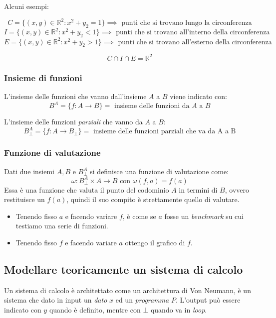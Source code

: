 \documentclass{article}
\begin{document}
Alcuni esempi:

$$C=\{(x,y)\in\mathbb{R}^2 : x^2+y_2=1\}\implies \text{ punti che si trovano lungo la circonferenza}$$
$$I=\{(x,y)\in\mathbb{R}^2 : x^2+y_2<1\}\implies \text{ punti che si trovano all'interno della circonferenza}$$
$$E=\{(x,y)\in\mathbb{R}^2 : x^2+y_2>1\}\implies \text{ punti che si trovano all'esterno della circonferenza}$$

$$C\cap I\cap E = \mathbb{R}^2$$

\subsubsection{Insieme di funzioni}
L'insieme delle funzioni che vanno dall'insieme $A$ a $B$ viene indicato con:
$$B^A=\{f:A\rightarrow B\} = \text{ insieme delle funzioni da } A \text{ a } B$$

L'insieme delle funzioni \textit{parziali} che vanno da $A$ a $B$:
$$B_{\bot}^A =\{f:A\rightarrow B_{\bot}\}=\text{ insieme delle funzioni parziali che va da A a B}$$

\subsubsection{Funzione di valutazione}
Dati due insiemi $A,B$ e $B_{\bot}^A$ si definisce una funzione di valutazione come:
$$\omega : B_{\bot}^A\times A \rightarrow B \text{ con } \omega (f,a)=f(a)$$
Essa è una funzione che valuta il punto del codominio $A$ in termini di $B$, ovvero restituisce un
$f(a)$, quindi il suo compito è strettamente quello di valutare.

\begin{itemize}
    \item Tenendo fisso $a$ e facendo variare $f$, è come se $a$ fosse un \textit{benchmark}
          su cui testiamo una serie di funzioni.
    \item Tenendo fisso $f$ e facendo variare $a$ ottengo il grafico di $f$.
\end{itemize}

\subsection{Modellare teoricamente un sistema di calcolo}
Un sistema di calcolo è architettato come un architettura di Von Neumann, è un sistema che dato
in input un \textit{dato} $x$ ed un \textit{programma} $P$. L'output può essere indicato con $y$ quando è definito,
mentre con $\bot$ quando va in \textit{loop}.
\end{document}
